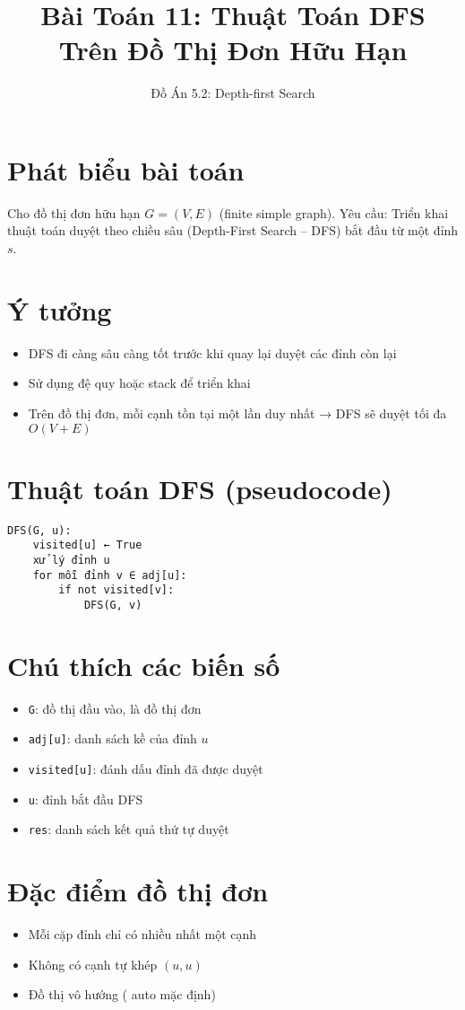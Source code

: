 \documentclass[12pt]{article}
\title{Bài Toán 11: Thuật Toán DFS Trên Đồ Thị Đơn Hữu Hạn}
\author{Đồ Án 5.2: Depth-first Search}
\date{}
\begin{document}
\maketitle

\section*{Phát biểu bài toán}
Cho đồ thị đơn hữu hạn $G = (V, E)$ (finite simple graph).  
Yêu cầu: Triển khai thuật toán duyệt theo chiều sâu (Depth-First Search – DFS) bắt đầu từ một đỉnh $s$.

\section*{Ý tưởng}
\begin{itemize}
    \item DFS đi càng sâu càng tốt trước khi quay lại duyệt các đỉnh còn lại
    \item Sử dụng đệ quy hoặc stack để triển khai
    \item Trên đồ thị đơn, mỗi cạnh tồn tại một lần duy nhất → DFS sẽ duyệt tối đa $O(V + E)$
\end{itemize}

\section*{Thuật toán DFS (pseudocode)}
\begin{verbatim}
DFS(G, u):
    visited[u] ← True
    xử lý đỉnh u
    for mỗi đỉnh v ∈ adj[u]:
        if not visited[v]:
            DFS(G, v)
\end{verbatim}

\section*{Chú thích các biến số}
\begin{itemize}
    \item \texttt{G}: đồ thị đầu vào, là đồ thị đơn
    \item \texttt{adj[u]}: danh sách kề của đỉnh $u$
    \item \texttt{visited[u]}: đánh dấu đỉnh đã được duyệt
    \item \texttt{u}: đỉnh bắt đầu DFS
    \item \texttt{res}: danh sách kết quả thứ tự duyệt
\end{itemize}

\section*{Đặc điểm đồ thị đơn}
\begin{itemize}
    \item Mỗi cặp đỉnh chỉ có nhiều nhất một cạnh
    \item Không có cạnh tự khép $(u,u)$
    \item Đồ thị vô hướng ( auto mặc định)
\end{itemize}
\end{document}
